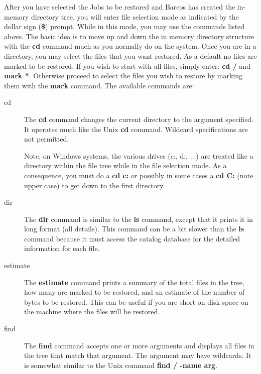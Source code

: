 After you have selected the Jobs to be restored and Bareos has created the
in-memory directory tree, you will enter file selection mode as indicated by
the dollar sign ({\bf \$}) prompt. While in this mode, you may use the
commands listed above. The basic idea is to move up and down the in memory
directory structure with the {\bf cd} command much as you normally do on the
system. Once you are in a directory, you may select the files that you want
restored. As a default no files are marked to be restored. If you wish to
start with all files, simply enter: {\bf cd /} and {\bf mark *}. Otherwise
proceed to select the files you wish to restore by marking them with the {\bf
mark} command. The available commands are:

\begin{description}

\item [cd]
  The {\bf cd} command changes the current directory to the argument specified.
  It operates much like the Unix {\bf cd} command.  Wildcard specifications are
  not permitted.

  Note, on Windows systems, the various drives (c:, d:, ...) are treated like a
  directory within the file tree while in the file selection mode. As a
  consequence, you must do a {\bf cd c:} or possibly in some cases a {\bf cd
    C:} (note upper case) to get down to the first directory.

\item [dir]
   The {\bf dir} command is similar to the {\bf ls} command, except that it
   prints it in long format (all details). This command can be a bit slower
   than the {\bf ls} command because it must access the catalog database for
   the detailed information for each file.

\item [estimate]
   The {\bf estimate} command prints a summary of the total files in the tree,
   how many are marked to be restored, and an estimate of the number of bytes
   to be restored. This can be useful if you are short on disk space on the
   machine where the files will be restored.

\item [find]
   The {\bf find} command accepts one or more arguments  and displays all files
   in the tree that match that argument. The argument  may have wildcards. It is
   somewhat similar to the Unix command  {\bf find / -name arg}.


\end{description}

